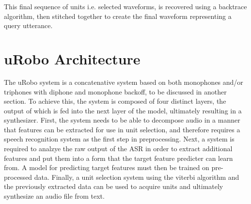 \documentclass[10pt, journal, compsoc]{IEEEtran}
\begin{document}
\begin{algorithm}
\begin{algorithmic}[1]
\EndFor
{}
     \EndFor
\EndFor
{}
\EndFunction
\end{algorithmic}
\end{algorithm}
This final sequence of units i.e. selected waveforms, is recovered using a backtrace algorithm, then stitched together to create the final waveform representing a query utterance.
\section{uRobo Architecture}
The uRobo system is a concatenative system based on both monophones and/or triphones with diphone and monophone backoff, to be discussed in another section. To achieve this, the system is composed of four distinct layers, the output of which is fed into the next layer of the model, ultimately resulting in a synthesizer. First, the system needs to be able to decompose audio in a manner that features can be extracted for use in unit selection, and therefore requires a speech recognition system as the first step in preprocessing. Next, a system is required to analzye the raw output of the ASR in order to extract additional features and put them into a form that the target feature predicter can learn from. A model for predicting target features must then be trained on pre-processed data. Finally, a unit selection system using the viterbi algorithm and the previously extracted data can be used to acquire units and ultimately synthesize an audio file from text.
\end{document}
